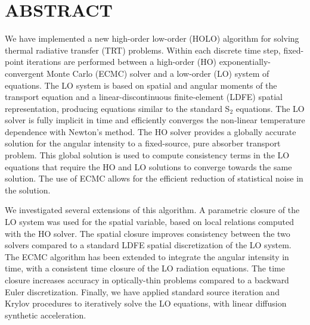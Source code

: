 %
%
%

\chapter*{ABSTRACT}

\pagestyle{plain} %
\setcounter{page}{2}

\indent 
We have implemented a new high-order low-order (HOLO) algorithm for solving
thermal radiative transfer (TRT) problems.  Within each discrete time step, fixed-point iterations are performed between a
high-order (HO) exponentially-convergent Monte Carlo (ECMC) solver and a low-order (LO)
system of equations.  The LO system is based on spatial
and angular moments of the transport equation and a linear-discontinuous
finite-element (LDFE) spatial representation, producing equations similar to the standard
S$_2$ equations.  
The LO solver is fully implicit in time and efficiently converges the non-linear
temperature dependence with Newton's method.   The HO solver
provides a globally accurate solution
for the angular intensity to a fixed-source, pure absorber transport problem.  This
global solution is used to compute consistency terms in the LO equations that require the HO and LO solutions
to converge towards the same solution. The use of ECMC
allows for the efficient reduction of statistical noise in the solution.
  
We investigated several extensions of this algorithm.
 A parametric closure
of the LO system was used for the spatial variable, based on local
relations computed with the HO solver.
The spatial closure improves
consistency between the two solvers compared to a standard LDFE spatial
discretization of the LO system.  The ECMC algorithm has been
extended to integrate the angular intensity in time,
with a consistent time closure of the LO radiation equations.  The
time closure increases accuracy in optically-thin problems compared to a backward Euler discretization.  
Finally, we have applied standard source iteration and Krylov procedures to
iteratively solve the LO equations, with linear diffusion synthetic acceleration.  

